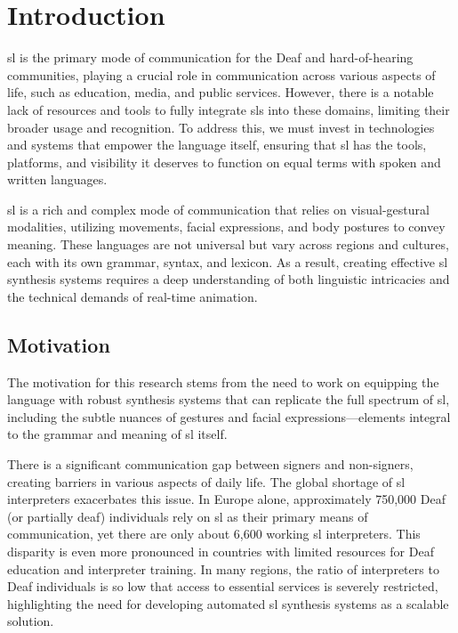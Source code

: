 \documentclass[../../main.tex]{subfiles}
\begin{document}
\chapter{Introduction}
\label{ch:introduction}

\gls{sl} is the primary mode of communication for the Deaf and hard-of-hearing communities, playing a crucial role in communication across various aspects of life, such as education, media, and public services. However, there is a notable lack of resources and tools to fully integrate \gls{sl}s into these domains, limiting their broader usage and recognition. To address this, we must invest in technologies and systems that empower the language itself, ensuring that \gls{sl} has the tools, platforms, and visibility it deserves to function on equal terms with spoken and written languages.

\gls{sl} is a rich and complex mode of communication that relies on visual-gestural modalities, utilizing movements, facial expressions, and body postures to convey meaning. These languages are not universal but vary across regions and cultures, each with its own grammar, syntax, and lexicon. As a result, creating effective \gls{sl} synthesis systems requires a deep understanding of both linguistic intricacies and the technical demands of real-time animation.

\section{Motivation}
\label{ch:introduction:motivation}

The motivation for this research stems from the need to work on equipping the language with robust synthesis systems that can replicate the full spectrum of \gls{sl}, including the subtle nuances of gestures and facial expressions—elements integral to the grammar and meaning of \gls{sl} itself.

There is a significant communication gap between signers and non-signers, creating barriers in various aspects of daily life. The global shortage of \gls{sl} interpreters exacerbates this issue. In Europe alone, approximately 750,000 Deaf (or partially deaf) individuals rely on \gls{sl} as their primary means of communication, yet there are only about 6,600 working \gls{sl} interpreters. This disparity is even more pronounced in countries with limited resources for Deaf education and interpreter training. In many regions, the ratio of interpreters to Deaf individuals is so low that access to essential services is severely restricted, highlighting the need for developing automated \gls{sl} synthesis systems as a scalable solution.
\end{document}
